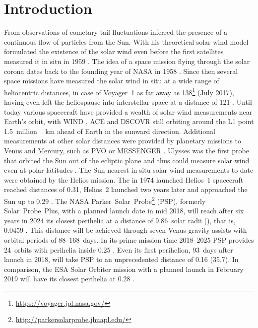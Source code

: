 
\section{Introduction}
From observations of cometary tail fluctuations \citet{Biermann1951} inferred the presence of a continuous flow of particles from the Sun. With his theoretical solar wind model \citet{Parker1958} formulated the existence of the solar wind even before the first satellites measured it in situ in 1959 \citep{Gringauz1960,Neugebauer1966}.
The idea of a space mission flying through the solar corona dates back to the founding year of NASA in 1958 \citep{McComas2008}. Since then several space missions have measured the solar wind in situ at a wide range of heliocentric distances, in case of Voyager~1 as far away as \SI{138}{\au}\footnote{\url{https://voyager.jpl.nasa.gov/}} (July 2017), having even left the heliospause into interstellar space at a distance of \SI{121}{\au} \citep{Gurnett2013}.
Until today various spacecraft have provided a wealth of solar wind measurements near Earth’s orbit, with WIND \citep{Lepping1995,Ogilvie1995}, ACE \citep{Stone1998} and DSCOVR \citep{Burt2012} still orbiting around the L1 point \SI{1.5}{million\,\km} ahead of Earth in the sunward direction. Additional measurements at other solar distances were provided by planetary missions to Venus and Mercury, such as PVO \citep{Colin1980} or MESSENGER \citep{Belcher1991}. Ulysses was the first probe that orbited the Sun out of the ecliptic plane and thus could measure solar wind even at polar latitudes \citep{McComas1998}. The Sun-nearest in situ solar wind measurements to date were obtained by the Helios mission. The in 1974 launched Helios~1 spacecraft reached distances of \SI{0.31}{\au}, Helios~2 launched two years later and approached the Sun up to \SI{0.29}{\au} \citep{Rosenbauer1977}.
The NASA Parker~Solar~Probe\footnote{\url{http://parkersolarprobe.jhuapl.edu/}} (PSP), formerly Solar~Probe~Plus, with a planned launch date in mid 2018, will reach after six years in 2024 its closest perihelia at a distance of 9.86~solar radii (\Rs), that is, \SI{0.0459}{\au} \citep{Fox2015}. This distance will be achieved through seven Venus gravity assists with orbital periods of 88--168~days. In its prime mission time 2018--2025 PSP provides 24~orbits with perihelia inside \SI{0.25}{\au} \citep{Fox2015}. Even its first perihelion, 93~days after launch in 2018, will take PSP to an unprecedented distance of \SI{0.16}{\au} (\SI{35.7}{\Rs}). In comparison, the ESA Solar Orbiter mission with a planned launch in February 2019 will have its closest perihelia at \SI{0.28}{\au} \citep{Muller2013}.


